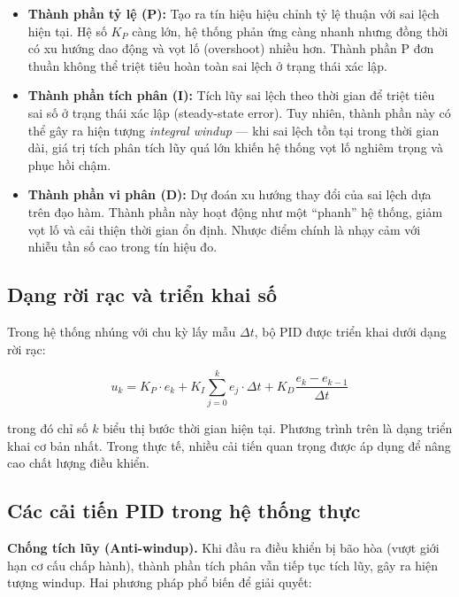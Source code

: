 \begin{itemize}
    \item \textbf{Thành phần tỷ lệ (P):} Tạo ra tín hiệu hiệu chỉnh tỷ lệ thuận với sai lệch hiện tại. Hệ số $K_P$ càng lớn, hệ thống phản ứng càng nhanh nhưng đồng thời có xu hướng dao động và vọt lố (overshoot) nhiều hơn. Thành phần P đơn thuần không thể triệt tiêu hoàn toàn sai lệch ở trạng thái xác lập.

    \item \textbf{Thành phần tích phân (I):} Tích lũy sai lệch theo thời gian để triệt tiêu sai số ở trạng thái xác lập (steady-state error). Tuy nhiên, thành phần này có thể gây ra hiện tượng \textit{integral windup} --- khi sai lệch tồn tại trong thời gian dài, giá trị tích phân tích lũy quá lớn khiến hệ thống vọt lố nghiêm trọng và phục hồi chậm.

    \item \textbf{Thành phần vi phân (D):} Dự đoán xu hướng thay đổi của sai lệch dựa trên đạo hàm. Thành phần này hoạt động như một ``phanh'' hệ thống, giảm vọt lố và cải thiện thời gian ổn định. Nhược điểm chính là nhạy cảm với nhiễu tần số cao trong tín hiệu đo.
\end{itemize}

\subsection{Dạng rời rạc và triển khai số}

Trong hệ thống nhúng với chu kỳ lấy mẫu $\Delta t$, bộ PID được triển khai dưới dạng rời rạc:

\begin{equation}
    u_k = K_P \cdot e_k + K_I \sum_{j=0}^{k} e_j \cdot \Delta t + K_D \frac{e_k - e_{k-1}}{\Delta t}
    \label{eq:pid_discrete}
\end{equation}

trong đó chỉ số $k$ biểu thị bước thời gian hiện tại. Phương trình trên là dạng triển khai cơ bản nhất. Trong thực tế, nhiều cải tiến quan trọng được áp dụng để nâng cao chất lượng điều khiển.

\subsection{Các cải tiến PID trong hệ thống thực}

\textbf{Chống tích lũy (Anti-windup).}
Khi đầu ra điều khiển bị bão hòa (vượt giới hạn cơ cấu chấp hành), thành phần tích phân vẫn tiếp tục tích lũy, gây ra hiện tượng windup. Hai phương pháp phổ biến để giải quyết:

